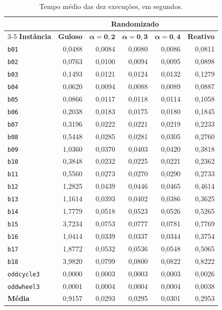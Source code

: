 \documentclass[12pt]{article}
\begin{document}
\begin{table}[htbp]
\centering
\caption{Tempo médio das dez execuções, em segundos.}
\label{tab:tempo}
\scriptsize
\setlength{\tabcolsep}{4pt}
\begin{tabular}{lrrrrr}
\toprule
& & \multicolumn{3}{c}{\textbf{Randomizado}} &\\
\cmidrule(lr){3-5}
\textbf{Instância} & \textbf{Guloso} & $\boldsymbol{\alpha=0{,}2}$ & $\boldsymbol{\alpha=0{,}3}$ & $\boldsymbol{\alpha=0{,}4}$ & \textbf{Reativo}\\
\midrule
\texttt{b01} & 0,0488 & 0,0084 & 0,0080 & 0,0086 & 0,0811\\
\texttt{b02} & 0,0763 & 0,0100 & 0,0094 & 0,0095 & 0,0898\\
\texttt{b03} & 0,1493 & 0,0121 & 0,0124 & 0,0132 & 0,1279\\
\texttt{b04} & 0,0620 & 0,0094 & 0,0088 & 0,0089 & 0,0887\\
\texttt{b05} & 0,0866 & 0,0117 & 0,0118 & 0,0114 & 0,1058\\
\texttt{b06} & 0,2038 & 0,0183 & 0,0175 & 0,0180 & 0,1845\\
\texttt{b07} & 0,3196 & 0,0222 & 0,0221 & 0,0219 & 0,2233\\
\texttt{b08} & 0,5448 & 0,0285 & 0,0281 & 0,0305 & 0,2760\\
\texttt{b09} & 1,0360 & 0,0370 & 0,0403 & 0,0420 & 0,3818\\
\texttt{b10} & 0,3848 & 0,0232 & 0,0225 & 0,0221 & 0,2362\\
\texttt{b11} & 0,5560 & 0,0273 & 0,0270 & 0,0290 & 0,2733\\
\texttt{b12} & 1,2825 & 0,0439 & 0,0446 & 0,0465 & 0,4614\\
\texttt{b13} & 1,1614 & 0,0393 & 0,0402 & 0,0386 & 0,3625\\
\texttt{b14} & 1,7779 & 0,0518 & 0,0523 & 0,0526 & 0,5265\\
\texttt{b15} & 3,7234 & 0,0753 & 0,0777 & 0,0781 & 0,7769\\
\texttt{b16} & 1,0414 & 0,0339 & 0,0337 & 0,0344 & 0,3754\\
\texttt{b17} & 1,8772 & 0,0532 & 0,0536 & 0,0548 & 0,5065\\
\texttt{b18} & 3,9820 & 0,0799 & 0,0800 & 0,0822 & 0,8222\\
\texttt{oddcycle3} & 0,0000 & 0,0003 & 0,0003 & 0,0003 & 0,0026\\
\texttt{oddwheel3} & 0,0001 & 0,0004 & 0,0004 & 0,0004 & 0,0038\\
\midrule
\textbf{Média} & 0,9157 & 0,0293 & 0,0295 & 0,0301 & 0,2953\\
\bottomrule
\end{tabular}
\end{table}
\end{document}
